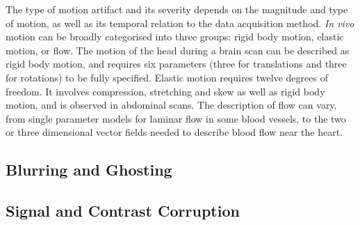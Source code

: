 \documentclass[class=article, crop=false]{standalone}
\begin{document}
The type of motion artifact and its severity depends on the magnitude and type of motion, as well as its temporal relation to the data acquisition method. \textit{In vivo} motion can be broadly categorised into three groups: rigid body motion, elastic motion, or flow. The motion of the head during a brain scan can be described as rigid body motion, and requires six parameters (three for translations and three for rotations) to be fully specified. Elastic motion requires twelve degrees of freedom. It involves compression, stretching and skew as well as rigid body motion, and is observed in abdominal scans. The description of flow can vary, from single parameter models for laminar flow in some blood vessels, to the two or three dimensional vector fields needed to describe blood flow near the heart. 


\subsection{Blurring and Ghosting}

\subsection{Signal and Contrast Corruption}
\end{document}
